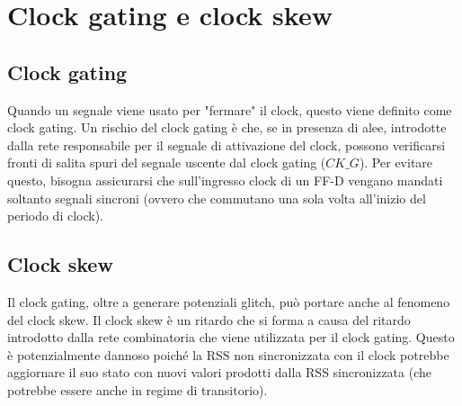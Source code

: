 \documentclass{article}
\begin{document}
\section{Clock gating e clock skew}

\subsection{Clock gating}

Quando un segnale viene usato per "fermare" il clock, questo viene definito come clock gating.
Un rischio del clock gating è che, se in presenza di alee, introdotte dalla rete responsabile per il segnale di attivazione del clock, possono verificarsi fronti di salita spuri del segnale uscente dal clock gating ($CK\_G$).
Per evitare questo, bisogna assicurarsi che sull'ingresso clock di un FF-D vengano mandati soltanto segnali sincroni (ovvero che commutano una sola volta all'inizio del periodo di clock).

\subsection{Clock skew}

Il clock gating, oltre a generare potenziali glitch, può portare anche al fenomeno del clock skew.
Il clock skew è un ritardo che si forma a causa del ritardo introdotto dalla rete combinatoria che viene utilizzata per il clock gating.
Questo è potenzialmente dannoso poiché la RSS non sincronizzata con il clock potrebbe aggiornare il suo stato con nuovi valori prodotti dalla RSS sincronizzata (che potrebbe essere anche in regime di transitorio).
\end{document}
